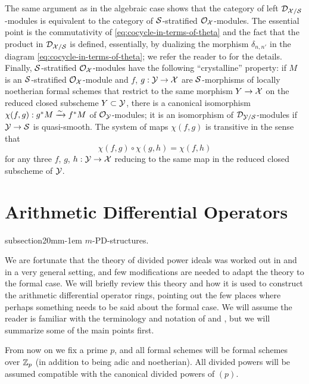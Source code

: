 \documentclass{article}
\makeatletter
\theoremstyle{change}
\renewcommand{\subsection}{\@startsection%
{subsection}{2}{0mm}{\baselineskip}{-1em}%
{\normalfont\normalsize\bfseries}}
\numberwithin{equation}{subsubsection}
\makeatother
\begin{document}
The same argument as in the algebraic case shows that the category of
left ${\cal D}_{{\cal X}/{\cal S}}$-modules is equivalent to the category of
${\cal S}$-stratified ${\cal O}_{\cal X}$-modules. The essential point is the
commutativity of \ref{eq:cocycle-in-terms-of-theta} and the fact that
the product in ${\cal D}_{{\cal X}/{\cal S}}$ is defined, essentially, by dualizing
the morphism $\delta_{n,n'}$ in the diagram
\ref{eq:cocycle-in-terms-of-theta}; we refer the reader to
\cite[\S2]{berthelot-ogus:1978} for the details. Finally,
${\cal S}$-stratified ${\cal O}_{\cal X}$-modules have the following ``crystalline''
property: if $M$ is an ${\cal S}$-stratified ${\cal O}_{\cal X}$-module and $f$,
$g:{\cal Y}\to{\cal X}$ are ${\cal S}$-morphisms of locally noetherian formal schemes
that restrict to the same morphism $Y\to{\cal X}$ on the reduced closed
subscheme $Y\subset{\cal Y}$, there is a canonical isomorphism
$\chi(f,g):g^*M\xrightarrow{\sim} f^*M$ of ${\cal O}_{\cal Y}$-modules; it is an isomorphism
of ${\cal D}_{{\cal Y}/{\cal S}}$-modules if ${\cal Y}\to{\cal S}$ is quasi-smooth. The system of maps
$\chi(f,g)$ is transitive in the sense that
\begin{displaymath}
  \chi(f,g)\circ\chi(g,h)=\chi(f,h)
\end{displaymath}
for any three $f$, $g$, $h:{\cal Y}\to{\cal X}$ reducing to the same map in the
reduced closed subscheme of ${\cal Y}$.

\section
{Arithmetic Differential Operators}
\label{sec:arith-diff}

\subsection{$m$-PD-structures.}
\label{sec:m-PD-structures}

We are fortunate that the theory of divided power ideals was worked
out in \cite{berthelot:1974} and \cite{berthelot:1990} in a very
general setting, and few modifications are needed to adapt the theory
to the formal case. We will briefly review this theory and how it is
used to construct the arithmetic differential operator rings, pointing
out the few places where perhaps something needs to be said about the
formal case. We will assume the reader is familiar with the
terminology and notation of \cite{berthelot:1996} and
\cite{berthelot:2000}, but we will summarize some of the main points
first.

From now on we fix a prime $p$, and all formal schemes will be formal
schemes over ${\mathbb Z}_p$ (in addition to being adic and noetherian). All
divided powers will be assumed compatible with the canonical divided
powers of $(p)$.  
\end{document}
